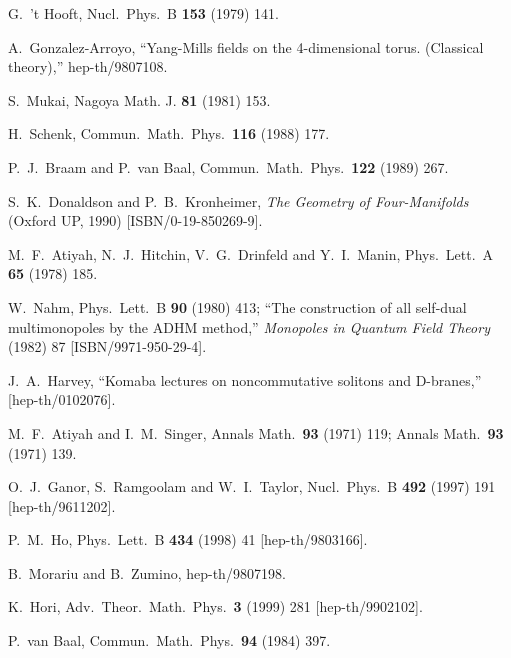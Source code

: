 \documentclass[a4paper,epsf,12pt]{article}
\begin{document}
\begin{thebibliography}{99}

G.~'t Hooft,
Nucl.\ Phys.\ B {\bf 153} (1979) 141.

A.~Gonzalez-Arroyo,
``Yang-Mills fields on the 4-dimensional torus. (Classical theory),''
hep-th/9807108.

S.~Mukai,
Nagoya Math. J. {\bf 81} (1981) 153.

H.~Schenk,
Commun.\ Math.\ Phys.\  {\bf 116} (1988) 177.

P.~J.~Braam and P.~van Baal,
Commun.\ Math.\ Phys.\  {\bf 122} (1989) 267.

S.~K.~Donaldson and P.~B.~Kronheimer, 
{\it The Geometry of Four-Manifolds} 
(Oxford UP, 1990) 
[ISBN/0-19-850269-9].

M.~F.~Atiyah, N.~J.~Hitchin, V.~G.~Drinfeld and Y.~I.~Manin,
Phys.\ Lett.\ A {\bf 65} (1978) 185.

W.~Nahm,
Phys.\ Lett.\ B {\bf 90} (1980) 413;
``The construction of all self-dual multimonopoles by the ADHM method,''
{\it Monopoles in Quantum Field Theory}
(1982) 87 [ISBN/9971-950-29-4].

J.~A.~Harvey,
``Komaba lectures on noncommutative solitons and D-branes,''
[hep-th/0102076].

M.~F.~Atiyah and I.~M.~Singer,
Annals Math.\  {\bf 93} (1971) 119;
Annals Math.\  {\bf 93} (1971) 139.

O.~J.~Ganor, S.~Ramgoolam and W.~I.~Taylor,
Nucl.\ Phys.\ B {\bf 492} (1997) 191
[hep-th/9611202].

P.~M.~Ho,
Phys.\ Lett.\ B {\bf 434} (1998) 41
[hep-th/9803166].

B.~Morariu and B.~Zumino,
hep-th/9807198.

K.~Hori,
Adv.\ Theor.\ Math.\ Phys.\  {\bf 3} (1999) 281
[hep-th/9902102].

P.~van Baal,
Commun.\ Math.\ Phys.\  {\bf 94} (1984) 397.


\end{thebibliography}
\end{document}
